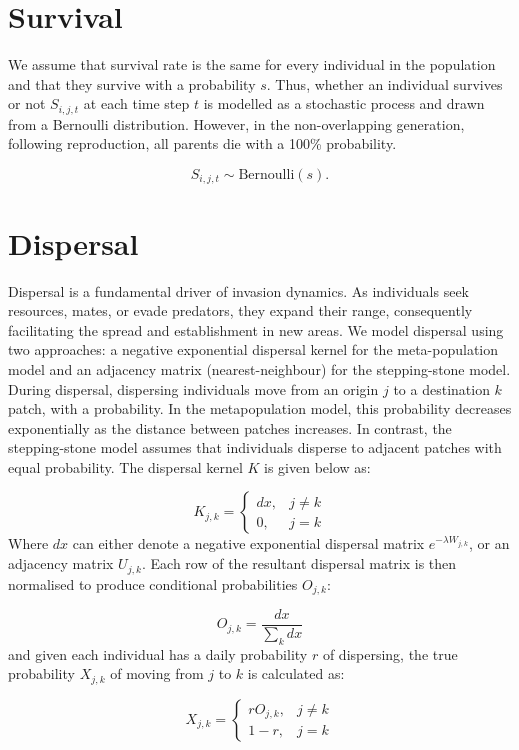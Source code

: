 \documentclass[
]{article}
\begin{document}
\section{Survival}\label{survival}

We assume that survival rate is the same for every individual in the
population and that they survive with a probability \(s\). Thus, whether
an individual survives or not \(S_{i,j,t}\) at each time step \(t\) is
modelled as a stochastic process and drawn from a Bernoulli
distribution. However, in the non-overlapping generation, following
reproduction, all parents die with a 100\% probability.

\[
S_{i,j,t} \sim\text{Bernoulli} (s).
\]

\section{Dispersal}\label{dispersal}

Dispersal is a fundamental driver of invasion dynamics. As individuals
seek resources, mates, or evade predators, they expand their range,
consequently facilitating the spread and establishment in new areas. We
model dispersal using two approaches: a negative exponential dispersal
kernel for the meta-population model and an adjacency matrix
(nearest-neighbour) for the stepping-stone model. During dispersal,
dispersing individuals move from an origin \(j\) to a destination \(k\)
patch, with a probability. In the metapopulation model, this probability
decreases exponentially as the distance between patches increases. In
contrast, the stepping-stone model assumes that individuals disperse to
adjacent patches with equal probability. The dispersal kernel \(K\) is
given below as:

\[
K_{j,k} = 
\begin{cases}
dx, & j \ne k \\
0, & j = k
\end{cases}
\] Where \(dx\) can either denote a negative exponential dispersal
matrix \(e^{-\lambda W_{j,k}}\), or an adjacency matrix \(U_{j,k}\).
Each row of the resultant dispersal matrix is then normalised to produce
conditional probabilities \(O_{j,k}\):

\[
O_{j,k} = \frac{dx} {\sum_{k} dx}
\] and given each individual has a daily probability \(r\) of
dispersing, the true probability \(X_{j,k}\) of moving from \(j\) to
\(k\) is calculated as:

\[
X_{j,k} =
\begin{cases}
rO_{j,k}, & j \ne k \\
1-r, & j = k 
\end{cases}
\]
\end{document}
